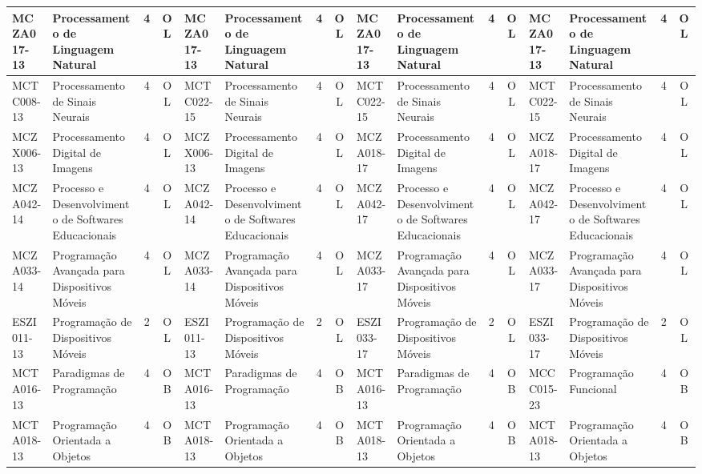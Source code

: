 \documentclass[a4paper]{article}
\begin{document}
\begin{landscape}
{\begin{longtable}{|l|p{.15\textheight}|c|c||l|p{.15\textheight}|c|c||l|p{.15\textheight}|c|c||l|p{.15\textheight}|c|c|}
    MCZA017-13 & Processamento de Linguagem Natural & 4 & OL &
    MCZA017-13 & Processamento de Linguagem Natural & 4 & OL &
    MCZA017-13 & Processamento de Linguagem Natural & 4 & OL &
    MCZA017-13 & Processamento de Linguagem Natural & 4 & OL \\ \hline
    
    MCTC008-13 & Processamento de Sinais Neurais & 4 & OL &
    MCTC022-15 & Processamento de Sinais Neurais & 4 & OL &
    MCTC022-15 & Processamento de Sinais Neurais & 4 & OL &
    MCTC022-15 & Processamento de Sinais Neurais & 4 & OL \\ \hline
    
    MCZX006-13 & Processamento Digital de Imagens & 4 & OL &
    MCZX006-13 & Processamento Digital de Imagens & 4 & OL &
    MCZA018-17 & Processamento Digital de Imagens & 4 & OL &
    MCZA018-17 & Processamento Digital de Imagens & 4 & OL \\ \hline
    
    MCZA042-14 & Processo e Desenvolvimento de Softwares Educacionais & 4 & OL &
    MCZA042-14 & Processo e Desenvolvimento de Softwares Educacionais & 4 & OL &
    MCZA042-17 & Processo e Desenvolvimento de Softwares Educacionais & 4 & OL & 
    MCZA042-17 & Processo e Desenvolvimento de Softwares Educacionais & 4 & OL \\ \hline
    
    MCZA033-14 & Programação Avançada para Dispositivos Móveis & 4 & OL &
    MCZA033-14 & Programação Avançada para Dispositivos Móveis & 4 & OL &
    MCZA033-17 & Programação Avançada para Dispositivos Móveis & 4 & OL & 
    MCZA033-17 & Programação Avançada para Dispositivos Móveis & 4 & OL \\ \hline
    
    ESZI011-13 & Programação de Dispositivos Móveis & 2 & OL &
    ESZI011-13 & Programação de Dispositivos Móveis & 2 & OL &
    ESZI033-17 & Programação de Dispositivos Móveis & 2 & OL &
    ESZI033-17 & Programação de Dispositivos Móveis & 2 & OL \\ \hline
    
    MCTA016-13 & Paradigmas de Programação & 4 & OB &
    MCTA016-13 & Paradigmas de Programação & 4 & OB &
    MCTA016-13 & Paradigmas de Programação & 4 & OB &
    MCCC015-23 & Programação Funcional     & 4 & OB\\ \hline

       
    MCTA018-13 & Programação Orientada a Objetos & 4 & OB &
    MCTA018-13 & Programação Orientada a Objetos & 4 & OB &
    MCTA018-13 & Programação Orientada a Objetos & 4 & OB &
    MCTA018-13 & Programação Orientada a Objetos & 4 & OB \\ \hline


\end{longtable}}
\end{landscape}
\end{document}
